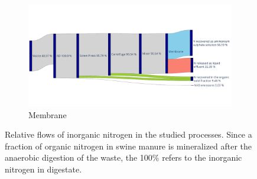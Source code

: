 \begin{refsection}[referencesCh6]
\begin{figure}[h!]
	\begin{subfigure}[t]{0.99\textwidth}
		\centering
		\includegraphics[angle=0,width=\linewidth, trim={0cm 2cm 0cm 2.5cm}, clip]{gfx/Chapter6/NitrogenFlow_Membrane_sankey.pdf} 
		\caption{Membrane}
		\label{fig:NitrogenFlow_Membrane_sankey}
	\end{subfigure}
	
	\caption{Relative flows of inorganic nitrogen in the studied processes. Since a fraction of organic nitrogen in swine manure is mineralized after the anaerobic digestion of the waste, the 100\% refers to the inorganic nitrogen in digestate.}
	\label{fig:Sankeys}
\end{figure}



\end{refsection}
